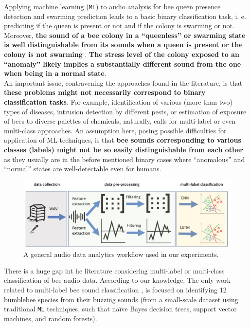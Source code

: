\documentclass[12pt]{report}
\begin{document}
	\par Applying machine learning ({\tt ML}) to audio analysis for bee queen presence detection and swarming prediction leads to a basic binary classification task, i. e. predicting if the queen is present or not and if the colony is swarming or not. Moreover, \textbf{the sound of a bee colony in a ``queenless'' or swarming state is well distinguishable from its sounds when a queen is present or the colony is not swarming} \cite{allen1956behaviourbeeswarming, hord2013behavioraudioanalysis}. \textbf{The stress level of the colony exposed to an ``anomaly'' likely implies a substantially different sound from the one when being in a normal state}.\\
	An important issue, contravening the approaches found in the literature, is that \textbf{these problems might not necessarily correspond to binary classification tasks}. For example, identification of various (more than two) types of diseases, intrusion detection by different pests, or estimation of exposure of bees to diverse palettes of chemicals, naturally, calls for multi-label or even multi-class approaches. An assumption here, posing possible difficulties for application of ML techniques, is that \textbf{bee sounds corresponding to various classes (labels) might not be so easily distinguishable from each other} as they usually are in the before mentioned binary cases where ``anomalous'' and ``normal'' states are well-detectable even for humans.
	
	\begin{figure}
		\centering
		\includegraphics[scale = 0.25]{beeaudioworkflow.png}
		\caption{A general audio data analytics workflow used in our experiments.}
		\label{fig:audioworkflow}
	\end{figure}
	
	\par There is a huge gap int he literature considering multi-label or multi-class classification of bee audio data. According to our knowledge. The only work related to multi-label bee sound classification \cite{gradivsek2017predictingbumblebees}, is focused on identifying 12 bumblebee species from their buzzing sounds (from a small-scale dataset using traditional {\tt ML} techniques, such that naïve Bayes decision trees, support vector machines, and random forests).
	
\end{document}
